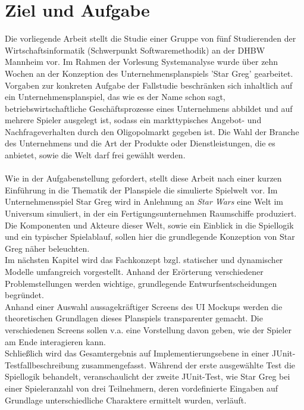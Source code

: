 \section{Ziel und Aufgabe}
\label{sec:einleitung-ziel}

Die vorliegende Arbeit stellt die Studie einer Gruppe von fünf Studierenden der Wirtschaftsinformatik (Schwerpunkt Softwaremethodik) an der DHBW Mannheim vor. Im Rahmen der Vorlesung Systemanalyse wurde über zehn Wochen an der Konzeption des Unternehmensplanspiels 'Star Greg' gearbeitet. Vorgaben zur konkreten Aufgabe der Fallstudie beschränken sich inhaltlich auf ein Unternehmensplanspiel, das wie es der Name schon sagt, betriebswirtschaftliche Geschäftsprozesse eines Unternehmens abbildet und auf mehrere Spieler ausgelegt ist, sodass ein markttypisches Angebot- und Nachfrageverhalten durch den Oligopolmarkt gegeben ist. Die Wahl der Branche des Unternehmens und die Art der Produkte oder Dienstleistungen, die es anbietet, sowie die Welt darf frei gewählt werden. 
\\
\\
Wie in der Aufgabenstellung gefordert, stellt diese Arbeit nach einer kurzen Einführung in die Thematik der Planspiele die simulierte Spielwelt vor. Im Unternehmensspiel Star Greg wird in Anlehnung an \textit{Star Wars} eine Welt im Universum simuliert, in der ein Fertigungsunternehmen Raumschiffe produziert. Die Komponenten und Akteure dieser Welt, sowie ein Einblick in die Spiellogik und ein typischer Spielablauf, sollen hier die grundlegende Konzeption von Star Greg näher beleuchten.  
\\
Im nächsten Kapitel wird das Fachkonzept bzgl. statischer und dynamischer Modelle umfangreich vorgestellt. Anhand der Erörterung verschiedener Problemstellungen werden wichtige, grundlegende Entwurfsentscheidungen begründet.
\\
Anhand einer Auswahl aussagekräftiger Screens des UI Mockups werden die theoretischen Grundlagen dieses Planspiels transparenter gemacht. Die verschiedenen Screens sollen v.a. eine Vorstellung davon geben, wie der Spieler am Ende interagieren kann. 
\\
Schließlich wird das Gesamtergebnis auf Implementierungsebene in einer  JUnit-Testfallbeschreibung zusammengefasst. Während der erste ausgewählte Test die Spiellogik behandelt, veranschaulicht der zweite JUnit-Test, wie Star Greg bei einer Spieleranzahl von drei Teilnehmern, deren vordefinierte Eingaben auf Grundlage unterschiedliche Charaktere ermittelt wurden, verläuft. 


